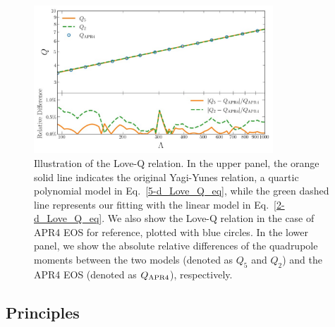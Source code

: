 \documentclass[a4paper,11pt]{article}
\begin{document}
\begin{figure}[tbp]
\centering
\includegraphics[width=0.8\textwidth]{2d-5d difference.pdf}%
\caption{Illustration of the Love-Q relation. In the upper panel, the orange
solid line indicates the original Yagi-Yunes relation, a quartic polynomial model
 in
Eq.~\eqref{5-d_Love_Q_eq}, while the green dashed line represents our fitting
with the linear model in Eq.~\eqref{2-d_Love_Q_eq}. We also show the Love-Q
relation in the case of APR4 EOS for reference, plotted with blue circles.
In the lower panel, we show the absolute relative differences of the quadrupole
moments
between the two
models (denoted as $Q_5$ and $Q_2$) and the APR4 EOS (denoted as $Q_{\rm
APR4}$), respectively.}\label{relative_difference}
\end{figure}

\subsection{Principles}
\label{subsec:framework_principles}
\end{document}
